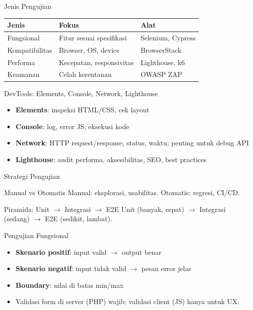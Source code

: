 \documentclass[handout]{beamer}
\begin{document}
\begin{frame}{Jenis Pengujian}
	\begin{tabular}{|l|l|l|}
		\hline
		\textbf{Jenis} & \textbf{Fokus} & \textbf{Alat} \\
		\hline
		Fungsional & Fitur sesuai spesifikasi & Selenium, Cypress \\
		\hline
		Kompatibilitas & Browser, OS, device & BrowserStack \\
		\hline
		Performa & Kecepatan, responsivitas & Lighthouse, k6 \\
		\hline
		Keamanan & Celah kerentanan & OWASP ZAP \\
		\hline
	\end{tabular}
\end{frame}

\begin{frame}{DevTools: Elements, Console, Network, Lighthouse}
	\begin{itemize}
		\item \textbf{Elements}: inspeksi HTML/CSS, cek layout
		\item \textbf{Console}: log, error JS, eksekusi kode
		\item \textbf{Network}: HTTP request/response, status, waktu; penting untuk debug API
		\item \textbf{Lighthouse}: audit performa, aksesibilitas, SEO, best practices
	\end{itemize}
\end{frame}

\begin{frame}{Strategi Pengujian}
	\begin{block}{Manual vs Otomatis}
		Manual: eksplorasi, usabilitas. Otomatis: regresi, CI/CD.
	\end{block}
	\begin{block}{Piramida: Unit $\to$ Integrasi $\to$ E2E}
		Unit (banyak, cepat) $\to$ Integrasi (sedang) $\to$ E2E (sedikit, lambat).
	\end{block}
\end{frame}

\begin{frame}{Pengujian Fungsional}
	\begin{itemize}
		\item \textbf{Skenario positif}: input valid $\to$ output benar
		\item \textbf{Skenario negatif}: input tidak valid $\to$ pesan error jelas
		\item \textbf{Boundary}: nilai di batas min/max
		\item Validasi form di server (PHP) wajib; validasi client (JS) hanya untuk UX.
	\end{itemize}
\end{frame}
\end{document}
